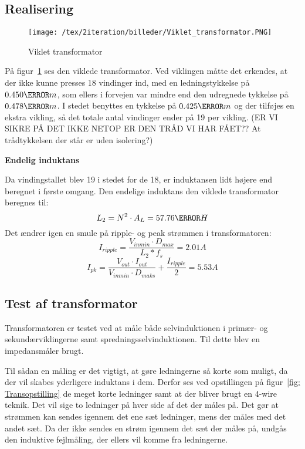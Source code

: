 \subsection{Realisering}
\begin{figure}[H]
	\center
	\texttt{[image: /tex/2iteration/billeder/Viklet\_transformator.PNG]}
	\caption{Viklet transformator}
	\label{fig: Viklettrans}
\end{figure}
På figur~\ref{fig: Viklettrans} ses den viklede transformator. Ved viklingen måtte det erkendes, at der ikke kunne presses 18 vindinger ind, med en ledningstykkelse på $0.450\milli m$, som ellers i forvejen var mindre end den udregnede tykkelse på $0.478\milli m$. I stedet benyttes en tykkelse på $0.425\milli m$ og der tilføjes en ekstra vikling, så det totale antal vindinger ender på 19 per vikling. (ER VI SIKRE PÅ DET IKKE NETOP ER DEN TRÅD VI HAR FÅET?? At trådtykkelsen der står er uden isolering?)

\noindent \textbf{Endelig induktans}


\noindent Da vindingstallet blev 19 i stedet for de 18, er induktansen lidt højere end beregnet i første omgang. Den endelige induktans den viklede transformator beregnes til:
\begin{equation} \label{L_2}
L_2 = N^2 \cdot A_L = 57.76\micro H
\end{equation}
Det ændrer igen en smule på ripple- og peak strømmen i transformatoren:
\begin{equation} \label{I_ripple_final}
I_{ripple} = \frac{V_{inmin} \cdot D_{max}}{L_2*f_s} = 2.01A
\end{equation}
\begin{equation} \label{I_pk_final}
I_{pk} = \frac{V_{out} \cdot I_{out}}{V_{inmin} \cdot D_{maks}} + \frac{I_{ripple}}{2} = 5.53A
\end{equation}

\subsection{Test af transformator}
Transformatoren er testet ved at måle både selvinduktionen i primær- og sekundærviklingerne samt spredningsselvinduktionen. Til dette blev en impedansmåler brugt. 


\noindent Til sådan en måling er det vigtigt, at gøre ledningerne så korte som muligt, da der vil skabes yderligere induktans i dem. Derfor ses ved opstillingen på figur~\ref{fig: Transopstilling} de meget korte ledninger samt at der bliver brugt en 4-wire teknik. Det vil sige to ledninger på hver side af det der måles på. Det gør at strømmen kan sendes igennem det ene sæt ledninger, mens der måles med det andet sæt. Da der ikke sendes en strøm igennem det sæt der måles på, undgås den induktive fejlmåling, der ellers vil komme fra ledningerne. 

